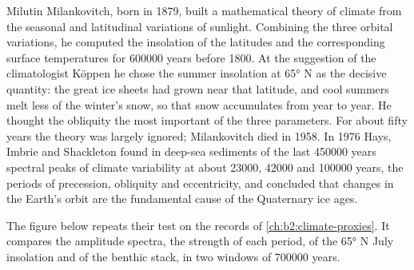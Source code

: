 \begin{history}
Milutin Milankovitch, born in 1879, built a mathematical theory of climate from the seasonal and latitudinal variations of sunlight. Combining the three orbital variations,
he computed the insolation of the latitudes and the corresponding surface temperatures for
\num{600000} years before 1800. At the suggestion of the climatologist Köppen he chose the summer
insolation at \ang{65} N as the decisive quantity: the great ice sheets had grown near that
latitude, and cool summers melt less of the winter's snow, so that snow accumulates from year to
year. He thought the obliquity the most important of the three parameters. For about fifty years
the theory was largely ignored; Milankovitch died in 1958. In 1976 Hays, Imbrie and Shackleton
found in deep-sea sediments of the last \num{450000} years spectral peaks of climate variability
at about \num{23000}, \num{42000} and \num{100000} years, the periods of precession, obliquity and
eccentricity, and concluded that changes in the Earth's orbit are the fundamental cause of the
Quaternary ice ages.
\end{history}

The figure below repeats their test on the records of \cref{ch:b2:climate-proxies}. It compares the
amplitude spectra, the strength of each period, of the \ang{65} N July insolation and of the
benthic stack, in two windows of \num{700000} years.

